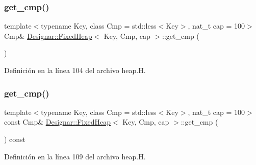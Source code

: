 \subsubsection{\texorpdfstring{get\+\_\+cmp()}{get\_cmp()}\hspace{0.1cm}{\footnotesize\ttfamily [1/2]}}
{\footnotesize\ttfamily template$<$typename Key, class Cmp = std\+::less$<$\+Key$>$, nat\+\_\+t cap = 100$>$ \\
Cmp\& \hyperlink{class_designar_1_1_fixed_heap}{Designar\+::\+Fixed\+Heap}$<$ Key, Cmp, cap $>$\+::get\+\_\+cmp (\begin{DoxyParamCaption}{ }\end{DoxyParamCaption})\hspace{0.3cm}{\ttfamily [inline]}}



Definición en la línea 104 del archivo heap.\+H.

\mbox{\label{class_designar_1_1_fixed_heap_a88f1060c9630d0c8e56fd58370b9a875}} 
\subsubsection{\texorpdfstring{get\+\_\+cmp()}{get\_cmp()}\hspace{0.1cm}{\footnotesize\ttfamily [2/2]}}
{\footnotesize\ttfamily template$<$typename Key, class Cmp = std\+::less$<$\+Key$>$, nat\+\_\+t cap = 100$>$ \\
const Cmp\& \hyperlink{class_designar_1_1_fixed_heap}{Designar\+::\+Fixed\+Heap}$<$ Key, Cmp, cap $>$\+::get\+\_\+cmp (\begin{DoxyParamCaption}{ }\end{DoxyParamCaption}) const\hspace{0.3cm}{\ttfamily [inline]}}



Definición en la línea 109 del archivo heap.\+H.

\mbox{\label{class_designar_1_1_fixed_heap_a00227ce55200154dac2fcfb42026e353}} 
